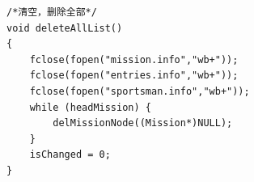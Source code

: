 \documentclass[10pt,a4paper]{article}
\begin{document}
\begin{footnotesize}
\begin{verbatim}
/*清空，删除全部*/
void deleteAllList()
{
    fclose(fopen("mission.info","wb+"));
    fclose(fopen("entries.info","wb+"));
    fclose(fopen("sportsman.info","wb+"));
    while (headMission) {
        delMissionNode((Mission*)NULL);
    }
    isChanged = 0;
}
\end{verbatim}
\end{footnotesize}
\end{document}
